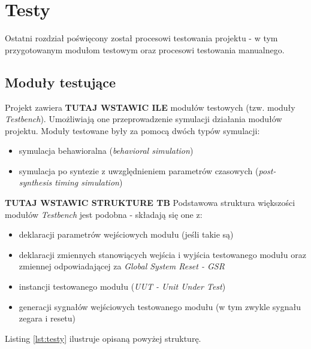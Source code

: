 \documentclass[12pt] {article}
\begin{document}
\section{Testy}
Ostatni rozdział poświęcony został procesowi testowania projektu - w tym przygotowanym modułom testowym oraz procesowi testowania manualnego. 

\subsection{Moduły testujące}
Projekt zawiera \textbf{TUTAJ WSTAWIC ILE} modułów testowych (tzw. moduły \textit{Testbench}). Umożliwiają one przeprowadzenie symulacji działania modułów projektu. Moduły testowane były za pomocą dwóch typów symulacji:
\begin{itemize}
\item symulacja behawioralna (\textit{behavioral simulation})
\item symulacja po syntezie z uwzględnieniem parametrów czasowych (\textit{post-synthesis timing simulation})
\end{itemize}
\textbf{TUTAJ WSTAWIC STRUKTURE TB}
Podstawowa struktura większości modułów \textit{Testbench} jest podobna - składają się one z:
\begin{itemize}
\item deklaracji parametrów wejściowych modułu (jeśli takie są)
\item deklaracji zmiennych stanowiących wejścia i wyjścia testowanego modułu oraz zmiennej odpowiadającej za \textit{Global System Reset - GSR}
\item instancji testowanego modułu (\textit{UUT - Unit Under Test})
\item generacji sygnałów wejściowych testowanego modułu (w tym zwykle sygnału zegara i resetu)
\end{itemize}
Listing \ref{lst:testy} ilustruje opisaną powyżej strukturę.
\end{document}
